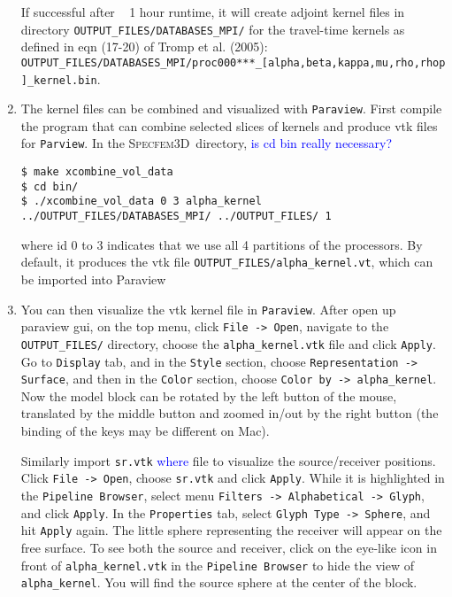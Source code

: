 \documentclass[10pt,fleqn,letterpaper]{article}
\newcommand{\specfem}{\textsc{Specfem3D}}
\newcommand{\blue}[1]{\textcolor{blue}{#1}}
\begin{document}
\begin{enumerate}
If successful after ~ 1 hour runtime, it will create adjoint kernel files in directory \verb+OUTPUT_FILES/DATABASES_MPI/+ for the travel-time kernels as defined in eqn (17-20) of Tromp et al. (2005): \verb+  OUTPUT_FILES/DATABASES_MPI/proc000***_[alpha,beta,kappa,mu,rho,rhop]_kernel.bin+.

\item The kernel files can be combined and visualized with \verb+Paraview+. First compile the program that can combine selected slices of kernels and produce vtk files for \verb+Parview+. In the \specfem\ directory, \blue{is cd bin really necessary?}
\begin{lstlisting}
$ make xcombine_vol_data
$ cd bin/ 
$ ./xcombine_vol_data 0 3 alpha_kernel ../OUTPUT_FILES/DATABASES_MPI/ ../OUTPUT_FILES/ 1
\end{lstlisting}
where id 0 to 3 indicates that we use all 4 partitions of the processors. By default, it produces the vtk file \verb+OUTPUT_FILES/alpha_kernel.vt+, which can be imported into Paraview 

\item You can then visualize the vtk kernel file in \verb+Paraview+. After open up paraview gui, on the top menu, click \verb+File -> Open+, navigate to the \verb+OUTPUT_FILES/+ directory, choose the \verb+alpha_kernel.vtk+ file and click \verb+Apply+. Go to \verb+Display+ tab, and in the \verb+Style+ section, choose \verb+Representation -> Surface+, and then in the \verb+Color+ section, choose \verb+Color by -> alpha_kernel+. Now the model block can be rotated by the left button of the mouse, translated by the middle button and zoomed in/out by the right button (the binding of the keys may be different on Mac).

   Similarly import \verb+sr.vtk+ \blue{where} file to visualize the source/receiver positions. Click \verb+File -> Open+, choose \verb+sr.vtk+ and click \verb+Apply+. While it is highlighted in the \verb+Pipeline Browser+, select menu \verb+Filters -> Alphabetical -> Glyph+, and click \verb+Apply+. In the \verb+Properties+ tab, select \verb+Glyph Type -> Sphere+, and hit \verb+Apply+ again. The little sphere representing the receiver will appear on the free surface. To see both the source and receiver, click on the eye-like icon in front of \verb+alpha_kernel.vtk+ in the \verb+Pipeline Browser+ to hide the view of \verb+alpha_kernel+. You will find the source sphere at the center of the block.


\end{enumerate}
\end{document}
